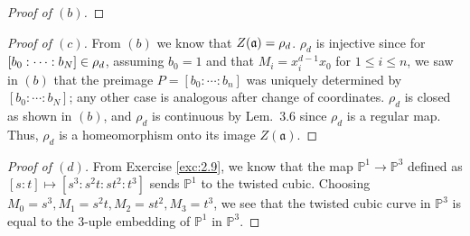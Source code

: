 \documentclass[12pt,letterpaper]{article}
\theoremstyle{definition}
\theoremstyle{remark}
\numberwithin{equation}{section}
\numberwithin{figure}{problem}
\let\Im\relax
\DeclareMathOperator{\Im}{im}
\DeclareMathOperator{\Ker}{Ker}
\newcommand{\PP}{\mathbb{P}}
\begin{document}
\begin{proof}[Proof of $(b)$]
\end{proof}
\begin{proof}[Proof of $(c)$]
  From $(b)$ we know that $Z(\mathfrak{a}) = \Im \rho_d$.
  $\rho_d$ is injective since for $[b_0:\cdots:b_N] \in \Im\rho_d$,
  assuming $b_0 = 1$ and that $M_i = x_i^{d-1}x_0$ for $1 \le i \le n$, we saw in
  $(b)$ that the preimage $P = [b_0:\cdots:b_n]$ was uniquely determined by
  $[b_0:\cdots:b_N]$; any other case is analogous after change of coordinates.
  $\rho_d$ is closed as shown in $(b)$, and $\rho_d$ is continuous by Lem.~$3.6$
  since $\rho_d$ is a regular map. Thus, $\rho_d$ is a homeomorphism onto its
  image $Z(\mathfrak{a})$.
\end{proof}
\begin{proof}[Proof of $(d)$]
  From Exercise \ref{exc:2.9}, we know that the map $\PP^1 \to \PP^3$ defined as
  $[s:t] \mapsto [s^3: s^2t: st^2: t^3]$ sends $\PP^1$ to the twisted cubic.
  Choosing $M_0 = s^3, M_1 = s^2t, M_2 = st^2, M_3 = t^3$, we see that the twisted
  cubic curve in $\PP^3$ is equal to the $3$-uple embedding of $\PP^1$ in $\PP^3$. 
\end{proof}
\end{document}
